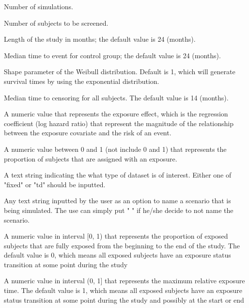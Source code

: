 \documentclass[a4paper]{book}
\begin{document}
%
\begin{Arguments}
\begin{ldescription}
\item[\code{nSim}] 
Number of simulations.

\item[\code{N}] 
Number of subjects to be screened.

\item[\code{duration}] 
Length of the study in months; the default value is 24 (months).

\item[\code{med.TTE.Control}] 
Median time to event for control group; the default value is 24 (months).

\item[\code{rho}] 
Shape parameter of the Weibull distribution. Default is 1, which will generate survival times by using the exponential distribution.

\item[\code{med.TimeToCensor}] 
Median time to censoring for all subjects. The default value is 14 (months).

\item[\code{beta}] 
A numeric value that represents the exposure effect, which is the regression coefficient (log hazard ratio) that represent the magnitude of the relationship between the exposure covariate and the risk of an event.

\item[\code{exp.prop}] 
A numeric value between 0 and 1 (not include 0 and 1) that represents the proportion of subjects that are assigned with an exposure.

\item[\code{type}] 
A text string indicating the what type of dataset is of interest. Either one of "fixed" or "td" should be inputted.

\item[\code{scenario}] 
Any text string inputted by the user as an option to name a scenario that is being simulated. The use can simply put " "  if he/she decide to not name the scenario.

\item[\code{prop.fullexp}] 
A numeric value in interval [0, 1) that represents the proportion of exposed subjects that are fully exposed from the beginning to the end of the study. The default value is 0, which means all exposed subjects have an exposure status transition at some point during the study

\item[\code{maxrelexptime}] 
A numeric value in interval (0, 1] that represents the maximum relative exposure time. The default value is 1, which means all exposed subjects have an exposure status transition at some point during the study and possibly at the start or end


\end{ldescription}
\end{Arguments}
\end{document}
